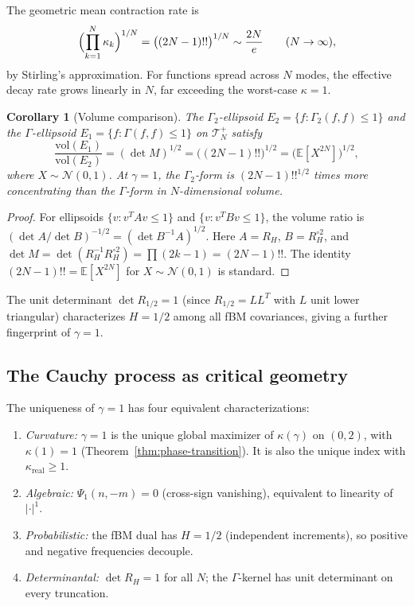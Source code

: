 \documentclass[11pt,a4paper]{article}
\theoremstyle{plain}
\newtheorem{corollary}[theorem]{Corollary}
\theoremstyle{definition}
\theoremstyle{remark}
\newcommand{\E}{\mathbb{E}}
\begin{document}
The geometric mean contraction rate is
\[
  \Bigl(\prod_{k=1}^N \kappa_k\Bigr)^{1/N}
  = \bigl((2N-1)!!\bigr)^{1/N} \sim \frac{2N}{e}
  \qquad (N \to \infty),
\]
by Stirling's approximation.
For functions spread across $N$ modes, the effective decay rate
grows linearly in $N$, far exceeding the worst-case $\kappa = 1$.

\begin{corollary}[Volume comparison]\label{cor:volume}
The $\Gamma_2$-ellipsoid
$E_2 = \{f : \Gamma_2(f,f) \leq 1\}$ and the $\Gamma$-ellipsoid
$E_1 = \{f : \Gamma(f,f) \leq 1\}$ on $\mathcal{T}_N^+$ satisfy
\begin{equation}\label{eq:volume-ratio}
  \frac{\mathrm{vol}(E_1)}{\mathrm{vol}(E_2)}
  = (\det M)^{1/2} = \bigl((2N-1)!!\bigr)^{1/2}
  = \bigl(\E[X^{2N}]\bigr)^{1/2},
\end{equation}
where $X \sim \mathcal{N}(0,1)$.
At $\gamma = 1$, the $\Gamma_2$-form is $(2N-1)!!^{1/2}$ times
more concentrating than the $\Gamma$-form in $N$-dimensional volume.
\end{corollary}

\begin{proof}
For ellipsoids $\{v : v^T A v \leq 1\}$ and $\{v : v^T B v \leq 1\}$,
the volume ratio is $(\det A / \det B)^{-1/2} = (\det B^{-1}A)^{1/2}$.
Here $A = R_H$, $B = R_H^{\circ 2}$, and $\det M = \det(R_H^{-1}R_H^{\circ 2})
= \prod(2k-1) = (2N-1)!!$.
The identity $(2N-1)!! = \E[X^{2N}]$ for $X \sim \mathcal{N}(0,1)$
is standard.
\end{proof}

The unit determinant $\det R_{1/2} = 1$ (since $R_{1/2} = LL^T$
with $L$ unit lower triangular) characterizes $H = 1/2$ among
all fBM covariances, giving a further fingerprint of $\gamma = 1$.


\subsection{The Cauchy process as critical geometry}

The uniqueness of $\gamma = 1$ has four equivalent characterizations:
\begin{enumerate}[label=(\alph*)]
\item \emph{Curvature:} $\gamma = 1$ is the unique global maximizer of
  $\kappa(\gamma)$ on $(0,2)$, with $\kappa(1) = 1$
  (Theorem~\ref{thm:phase-transition}).
  It is also the unique index with
  $\kappa_{\mathrm{real}} \geq 1$.
\item \emph{Algebraic:} $\Psi_1(n,-m) = 0$ (cross-sign vanishing),
  equivalent to linearity of $|\cdot|^1$.
\item \emph{Probabilistic:} the fBM dual has $H = 1/2$ (independent
  increments), so positive and negative frequencies decouple.
\item \emph{Determinantal:} $\det R_H = 1$ for all $N$; the
  $\Gamma$-kernel has unit determinant on every truncation.
\end{enumerate}
\end{document}
